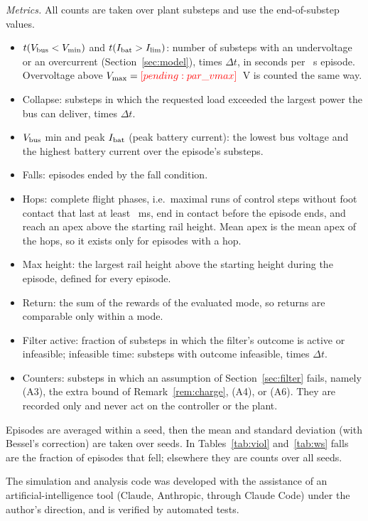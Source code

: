 \emph{Metrics.} All counts are taken over plant substeps and use the end-of-substep values.
\begin{itemize}
\item $t(V_{\mathrm{bus}}<V_{\min})$ and $t(I_{\mathrm{bat}}>I_{\lim})$: number of substeps with an undervoltage or an overcurrent (Section~\ref{sec:model}), times $\Delta t$, in seconds per ~s episode. Overvoltage above $V_{\max}=\res{par_vmax}$~V is counted the same way.
\item Collapse: substeps in which the requested load exceeded the largest power the bus can deliver, times $\Delta t$.
\item $V_{\mathrm{bus}}$ min and peak $I_{\mathrm{bat}}$ (peak battery current): the lowest bus voltage and the highest battery current over the episode's substeps.
\item Falls: episodes ended by the fall condition.
\item Hops: complete flight phases, i.e.\ maximal runs of control steps without foot contact that last at least ~ms, end in contact before the episode ends, and reach an apex above the starting rail height. Mean apex is the mean apex of the hops, so it exists only for episodes with a hop.
\item Max height: the largest rail height above the starting height during the episode, defined for every episode.
\item Return: the sum of the rewards of the evaluated mode, so returns are comparable only within a mode.
\item Filter active: fraction of substeps in which the filter's outcome is active or infeasible; infeasible time: substeps with outcome infeasible, times $\Delta t$.
\item Counters: substeps in which an assumption of Section~\ref{sec:filter} fails, namely (A3), the extra bound of Remark~\ref{rem:charge}, (A4), or (A6). They are recorded only and never act on the controller or the plant.
\end{itemize}
Episodes are averaged within a seed, then the mean and standard deviation (with Bessel's correction) are taken over seeds. In Tables~\ref{tab:viol} and~\ref{tab:ws} falls are the fraction of episodes that fell; elsewhere they are counts over all seeds.

The simulation and analysis code was developed with the assistance of an artificial-intelligence tool (Claude, Anthropic, through Claude Code) under the author's direction, and is verified by  automated tests.
